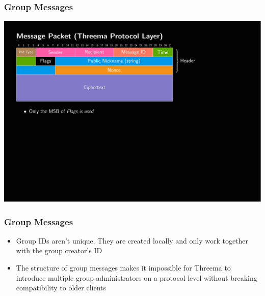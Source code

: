 \documentclass[
	aspectratio=169,
	xetex,
]{beamer}
\begin{document}
\begin{frame}
	\frametitle{Group Messages}
	\includegraphics[page=6,clip,trim={.99cm 7.5cm 3.2cm 1.8cm},width=\textwidth]{out/messages.pdf}
\end{frame}

\begin{frame}
	\frametitle{Group Messages}
	\begin{itemize}
		\item Group IDs aren't unique. They are created locally and only work together with the group creator's ID
		\item The structure of group messages makes it impossible for Threema to introduce multiple group administrators on a protocol level without breaking compatibility to older clients
	\end{itemize}
\end{frame}
\end{document}
